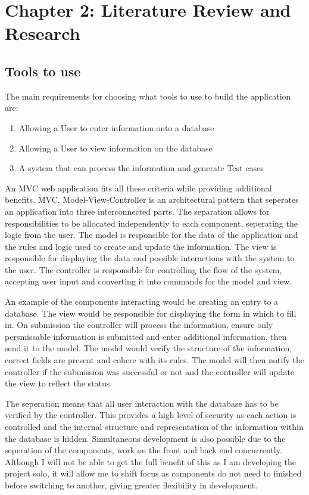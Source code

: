 \documentclass{article}
\begin{document}
\section{Chapter 2: Literature Review and Research}

\subsection{Tools to use}
\par The main requirements for choosing what tools to use to build the application are:
\begin{enumerate}
\item Allowing a User to enter information onto a database
\item Allowing a User to view information on the database
\item A system that can process the information and generate Test cases
\end{enumerate}
\par An MVC web application fits all these criteria while providing additional benefits. MVC, Model-View-Controller is an architectural pattern that seperates an application into three interconnected parts. The separation allows for responsibilities to be allocated independently to each component, seperating the logic from the user. The model is responsible for the data of the application and the rules and logic used to create and update the information. The view is responsible for displaying the data and possible interactions with the system to the user. The controller is responsible for controlling the flow of the system,  accepting user input and converting it into commands for the model and view.
\par An example of the components interacting would be creating an entry to a database. The view would be responsible for displaying the form in which to fill in. On submission the controller will process the information, ensure only persmissable information is submitted and enter additional information, then send it to the model. The model would verify the structure of the information, correct fields are present and cohere with its rules. The model will then notify the controller if the submission was successful or not and the controller will update the view to reflect the status.
\par The seperation means that all user interaction with the database has to be verified by the controller. This provides a high level of security as each action is controlled and the internal structure and representation of the information within the database is hidden. Simultaneous development is also possible due to the seperation of the components, work on the front and back end concurrently. Although I will not be able to get the full benefit of this as I am developing the project solo, it will allow me to shift focus as components do not need to finished before switching to another, giving greater flexibility in development. 
\end{document}
